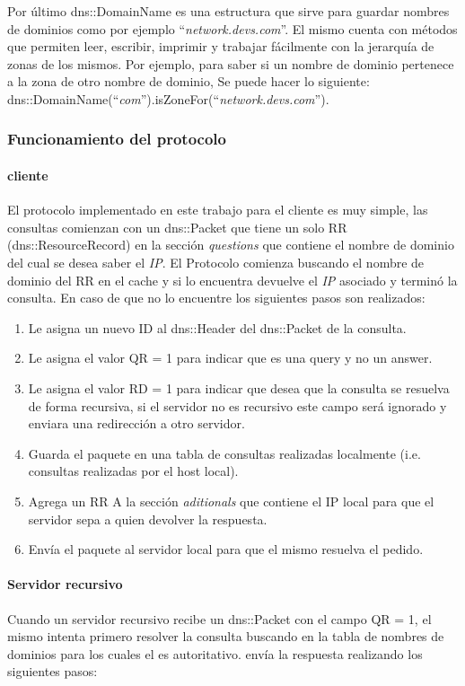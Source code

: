 \documentclass[10pt,a4paper]{article}
\begin{document}
Por último dns::DomainName es una estructura que sirve para guardar nombres de dominios como por ejemplo ``\textit{network.devs.com}''. El mismo cuenta con métodos que permiten leer, escribir, imprimir y trabajar fácilmente con la jerarquía de zonas de los mismos. Por ejemplo, para saber si un nombre de dominio pertenece a la zona de otro nombre de dominio, Se puede hacer lo siguiente: \\

dns::DomainName(``\textit{com}'').isZoneFor(``\textit{network.devs.com}'').
\subsubsection{Funcionamiento del protocolo}

\paragraph{cliente}
El protocolo implementado en este trabajo para el cliente es muy simple, las consultas comienzan con un dns::Packet que tiene un solo RR (dns::ResourceRecord) en la sección \textit{questions} que contiene el nombre de dominio del cual se desea saber el \textit{IP}. El Protocolo comienza buscando el nombre de dominio del RR en el cache y si lo encuentra devuelve el \textit{IP} asociado y terminó la consulta. En caso de que no lo encuentre los siguientes pasos son realizados:

\begin{enumerate}
\item Le asigna un nuevo ID al dns::Header del dns::Packet de la consulta.
\item Le asigna el valor QR = 1 para indicar que es una query y no un answer.
\item Le asigna el valor RD = 1 para indicar que desea que la consulta se resuelva de forma recursiva, si el servidor no es recursivo este campo será ignorado y enviara una redirección a otro servidor.
\item Guarda el paquete en una tabla de consultas realizadas localmente (i.e. consultas realizadas por el host local).
\item Agrega un RR A la sección \textit{aditionals} que contiene el IP local para que el servidor sepa a quien devolver la respuesta.
\item Envía el paquete al servidor local para que el mismo resuelva el pedido.
\end{enumerate}

\paragraph{Servidor recursivo}
Cuando un servidor recursivo recibe un dns::Packet con el campo QR = 1, el mismo intenta primero resolver la consulta buscando en la tabla de nombres de dominios para los cuales el es autoritativo. envía la respuesta realizando los siguientes pasos:
\end{document}
